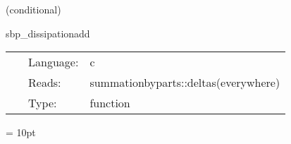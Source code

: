    (conditional) 

\hspace{5mm} sbp\_dissipationadd 

\hspace{5mm}{\it add sbp compatible dissipation to the right hand sides } 


\hspace{5mm}

 \begin{tabular*}{160mm}{cll} 
~ & Language:  & c \\ 
~ & Reads:  & summationbyparts::deltas(everywhere) \\ 
~ & Type:  & function \\ 
\end{tabular*} 



\vspace{5mm}\parskip = 10pt 

